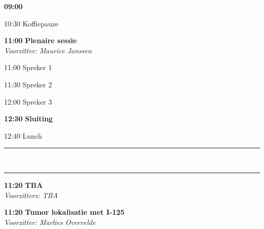 \documentclass[a4paper,10pt]{report}
\begin{document}
\begin{multicols*}{3}
\begin{packed_enum}
\item[{\color{Blue} {\textbf{09:00}}}]{}
        \vfill
\item[10:30] Koffiepauze
        \vfill
\item[\textbf{11:00}] {\textbf{Plenaire sessie}}\\\textit{Voorzitter: Maurice Janssen}
\item[11:00] Spreker 1
\item[11:30] Spreker 2
\item[12:00] Spreker 3
        \vfill
\item[\textbf{12:30}] \textbf{Sluiting}
\item[12:40] Lunch

\end{packed_enum}

\hrule \vspace{3mm}
\\
\hrule
\vfill

\begin{packed_enum}
\item[\textbf{11:20}] {\textbf{TBA}}\\\textit{Voorzitters: TBA}
\end{packed_enum}

{}
\begin{packed_enum}
\item[\textbf{11:20}]\textbf{Tumor lokalisatie met I-125}\\\textit{Voorzitter: Marlies Overvelde}
\end{packed_enum}


\end{multicols*}
\end{document}
